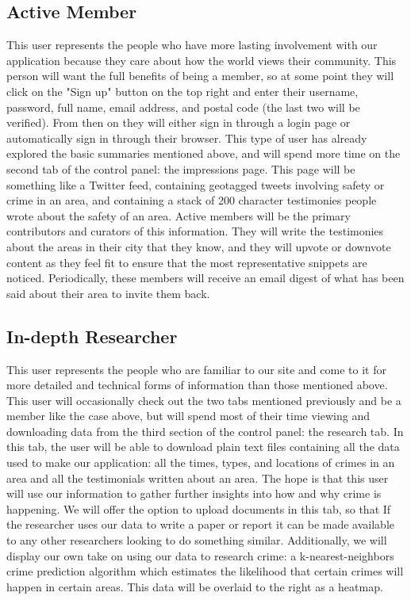 \documentclass[paper=a4, fontsize=11pt]{scrartcl} %
\numberwithin{equation}{section} %
\numberwithin{figure}{section} %
\numberwithin{table}{section} %
\begin{document}

\subsection{Active Member}

This user represents the people who have more lasting involvement with our application because they care about how the world views their community. This person will want the full benefits of being a member, so at some point they will click on the "Sign up" button on the top right and enter their username, password, full name, email address, and postal code (the last two will be verified). From then on they will either sign in through a login page or automatically sign in through their browser. This type of user has already explored the basic summaries mentioned above, and will spend more time on the second tab of the control panel: the impressions page. This page will be something like a Twitter feed, containing geotagged tweets involving safety or crime in an area, and containing a stack of 200 character testimonies people wrote about the safety of an area. Active members will be the primary contributors and curators of this information. They will write the testimonies about the areas in their city that they know, and they will upvote or downvote content as they feel fit to ensure that the most representative snippets are noticed. Periodically, these members will receive an email digest of what has been said about their area to invite them back.


\subsection{In-depth Researcher}

This user represents the people who are familiar to our site and come to it for more detailed and technical forms of information than those mentioned above. This user will occasionally check out the two tabs mentioned previously and be a member like the case above, but will spend most of their time viewing and downloading data from the third section of the control panel: the research tab. In this tab, the user will be able to download plain text files containing all the data used to make our application: all the times, types, and locations of crimes in an area and all the testimonials written about an area. The hope is that this user will use our information to gather further insights into how and why crime is happening. We will offer the option to upload documents in this tab, so that If the researcher uses our data to write a paper or report it can be made available to any other researchers looking to do something similar. Additionally, we will display our own take on using our data to research crime: a k-nearest-neighbors crime prediction algorithm which estimates the likelihood that certain crimes will happen in certain areas. This data will be overlaid to the right as a heatmap.
\end{document}
